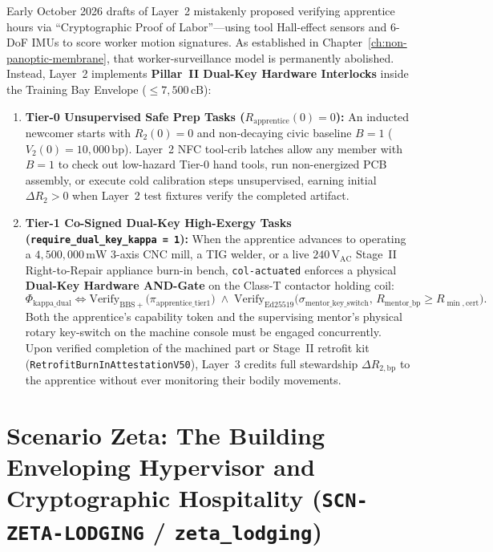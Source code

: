 Early October 2026 drafts of Layer~2 mistakenly proposed verifying apprentice hours via ``Cryptographic Proof of Labor''---using tool Hall-effect sensors and 6-DoF IMUs to score worker motion signatures. As established in Chapter~\ref{ch:non-panoptic-membrane}, that worker-surveillance model is permanently abolished. Instead, Layer~2 implements \textbf{Pillar~II Dual-Key Hardware Interlocks} inside the Training Bay Envelope ($\le 7{,}500\,\mathrm{cB}$):
\begin{enumerate}
    \item \textbf{Tier-0 Unsupervised Safe Prep Tasks ($R_{\mathrm{apprentice}}(0) = 0$):} An inducted newcomer starts with $R_2(0) = 0$ and non-decaying civic baseline $B = 1$ ($V_2(0) = 10{,}000\,\mathrm{bp}$). Layer~2 NFC tool-crib latches allow any member with $B=1$ to check out low-hazard Tier-0 hand tools, run non-energized PCB assembly, or execute cold calibration steps unsupervised, earning initial $\Delta R_2 > 0$ when Layer~2 test fixtures verify the completed artifact.
    \item \textbf{Tier-1 Co-Signed Dual-Key High-Exergy Tasks (\texttt{require\_dual\_key\_kappa = 1}):} When the apprentice advances to operating a $4{,}500{,}000\,\mathrm{mW}$ 3-axis CNC mill, a TIG welder, or a live $240\,\mathrm{V}_{\mathrm{AC}}$ Stage~II Right-to-Repair appliance burn-in bench, \texttt{col-actuated} enforces a physical \textbf{Dual-Key Hardware AND-Gate} on the Class-T contactor holding coil:
    \begin{equation}
        \Phi_{\mathrm{kappa\_dual}} \iff \mathrm{Verify}_{\mathrm{BBS+}}\bigl(\pi_{\mathrm{apprentice\_tier1}}\bigr) \;\land\; \mathrm{Verify}_{\mathrm{Ed25519}}\bigl(\sigma_{\mathrm{mentor\_key\_switch}},\, R_{\mathrm{mentor\_bp}} \ge R_{\min,\mathrm{cert}}\bigr).
        \label{eq:l2-kappa-dual-key}
    \end{equation}
    Both the apprentice's capability token and the supervising mentor's physical rotary key-switch on the machine console must be engaged concurrently. Upon verified completion of the machined part or Stage~II retrofit kit (\texttt{RetrofitBurnInAttestationV50}), Layer~3 credits full stewardship $\Delta R_{2,\mathrm{bp}}$ to the apprentice without ever monitoring their bodily movements.
\end{enumerate}

\section{Scenario Zeta: The Building Enveloping Hypervisor and Cryptographic Hospitality (\texttt{SCN-ZETA-LODGING} / \texttt{zeta\_lodging})}
\label{sec:l2-wave-c-zeta}

